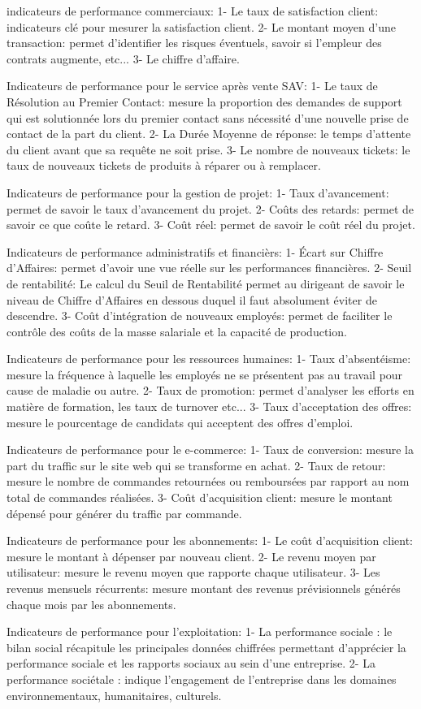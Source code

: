 indicateurs de performance commerciaux:
	1- Le taux de satisfaction client: indicateurs clé pour mesurer la satisfaction client.
	2- Le montant moyen d'une transaction: permet d'identifier les risques éventuels, savoir si l'empleur des contrats augmente, etc...
	3- Le chiffre d'affaire.

Indicateurs de performance pour le service après vente SAV:
	1- Le taux de Résolution au Premier Contact: mesure la proportion des demandes de support qui est solutionnée lors du premier contact 
		sans nécessité d’une nouvelle prise de contact de la part du client.
	2- La Durée Moyenne de réponse: le temps d'attente du client avant que sa requête ne soit prise.
	3- Le nombre de nouveaux tickets: le taux de nouveaux tickets de produits à réparer ou à remplacer.

Indicateurs de performance pour la gestion de projet:
	1- Taux d'avancement: permet de savoir le taux d'avancement du projet.
	2- Coûts des retards: permet de savoir ce que coûte le retard.
	3- Coût réel: permet de savoir le coût réel du projet.

Indicateurs de performance administratifs et financièrs:
	1- Écart sur Chiffre d’Affaires: permet d'avoir une vue réelle sur les performances financières.
	2- Seuil de rentabilité: Le calcul du Seuil de Rentabilité permet au dirigeant de savoir le niveau de Chiffre d’Affaires 
		en dessous duquel il faut absolument éviter de descendre.
	3- Coût d’intégration de nouveaux employés: permet de faciliter le contrôle des coûts de la masse salariale et la capacité de production.

Indicateurs de performance pour les ressources humaines:
	1- Taux d'absentéisme: mesure la fréquence à laquelle les employés ne se présentent pas au travail pour cause de maladie ou autre.
	2- Taux de promotion: permet d'analyser les efforts en matière de formation, les taux de turnover etc...
	3- Taux d’acceptation des offres: mesure le pourcentage de candidats qui acceptent des offres d’emploi.
	
Indicateurs de performance pour le e-commerce:
	1- Taux de conversion: mesure la part du traffic sur le site web qui se transforme en achat.
	2- Taux de retour: mesure le nombre de commandes retournées ou remboursées par rapport au nom total de commandes réalisées.
	3- Coût d’acquisition client: mesure le montant dépensé pour générer du traffic par commande.

Indicateurs de performance pour les abonnements:
	1- Le coût d’acquisition client: mesure le montant à dépenser par nouveau client.
	2- Le revenu moyen par utilisateur: mesure le revenu moyen que rapporte chaque utilisateur.
	3- Les revenus mensuels récurrents: mesure montant des revenus prévisionnels générés chaque mois par les abonnements.
	
Indicateurs de performance pour l’exploitation:
	1- La performance sociale : le bilan social récapitule les principales données chiffrées permettant d'apprécier 
		la performance sociale et les rapports sociaux au sein d'une entreprise. 
	2- La performance sociétale : indique l'engagement de l'entreprise dans les domaines environnementaux, humanitaires, culturels.